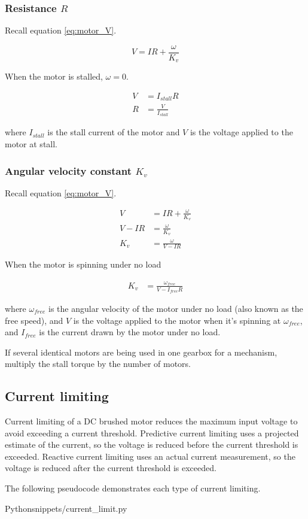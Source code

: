 \subsubsection{Resistance $R$}

Recall equation \eqref{eq:motor_V}.

\begin{equation*}
  V = IR + \frac{\omega}{K_v}
\end{equation*}

When the motor is stalled, $\omega = 0$.

\begin{align}
  V &= I_{stall} R \nonumber \\
  R &= \frac{V}{I_{stall}}
\end{align}

where $I_{stall}$ is the stall current of the motor and $V$ is the voltage
applied to the motor at stall.

\subsubsection{Angular velocity constant $K_v$}

Recall equation \eqref{eq:motor_V}.

\begin{align*}
  V &= IR + \frac{\omega}{K_v} \\
  V - IR &= \frac{\omega}{K_v} \\
  K_v &= \frac{\omega}{V - IR}
\end{align*}

When the motor is spinning under no load

\begin{align}
  K_v &= \frac{\omega_{free}}{V - I_{free}R}
\end{align}

where $\omega_{free}$ is the angular velocity of the motor under no load (also
known as the free speed), and $V$ is the voltage applied to the motor when it's
spinning at $\omega_{free}$, and $I_{free}$ is the current drawn by the motor
under no load.

If several identical motors are being used in one gearbox for a mechanism,
multiply the stall torque by the number of motors.

\subsection{Current limiting}

Current limiting of a DC brushed motor reduces the maximum input voltage to
avoid exceeding a current threshold. Predictive current limiting uses a
projected estimate of the current, so the voltage is reduced before the current
threshold is exceeded. Reactive current limiting uses an actual current
measurement, so the voltage is reduced after the current threshold is exceeded.

The following pseudocode demonstrates each type of current limiting.

\begin{code}{Python}{snippets/current_limit.py}
  \caption{Limits current of DC motor to $I_{max}$}
\end{code}
